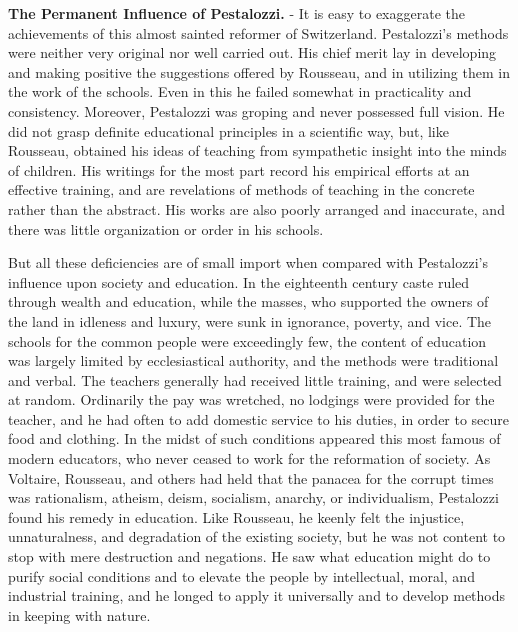 \documentclass[]{book}
\begin{document}
\textbf{The Permanent Influence of Pestalozzi.} - It is easy to exaggerate the achievements of this almost sainted reformer of Switzerland. Pestalozzi's methods were neither very original nor well carried out. His chief merit lay in developing and making positive the suggestions offered by Rousseau, and in utilizing them in the work of the schools. Even in this he failed somewhat in practicality and consistency. Moreover, Pestalozzi was groping and never possessed full vision. He did not grasp definite educational principles in a scientific way, but, like Rousseau, obtained his ideas of teaching from sympathetic insight into the minds of children. His writings for the most part record his empirical efforts at an effective training, and are revelations of methods of teaching in the concrete rather than the abstract. His works are also poorly arranged and inaccurate, and there was little organization or order in his schools.

But all these deficiencies are of small import when compared with Pestalozzi's influence upon society and education. In the eighteenth century caste ruled through wealth and education, while the masses, who supported the owners of the land in idleness and luxury, were sunk in ignorance, poverty, and vice. The schools for the common people were exceedingly few, the content of education was largely limited by ecclesiastical authority, and the methods were traditional and verbal. The teachers generally had received little training, and were selected at random. Ordinarily the pay was wretched, no lodgings were provided for the teacher, and he had often to add domestic service to his duties, in order to secure food and clothing. In the midst of such conditions appeared this most famous of modern educators, who never ceased to work for the reformation of society. As Voltaire, Rousseau, and others had held that the panacea for the corrupt times was rationalism, atheism, deism, socialism, anarchy, or individualism, Pestalozzi found his remedy in education. Like Rousseau, he keenly felt the injustice, unnaturalness, and degradation of the existing society, but he was not content to stop with mere destruction and negations. He saw what education might do to purify social conditions and to elevate the people by intellectual, moral, and industrial training, and he longed to apply it universally and to develop methods in keeping with nature.
\end{document}
